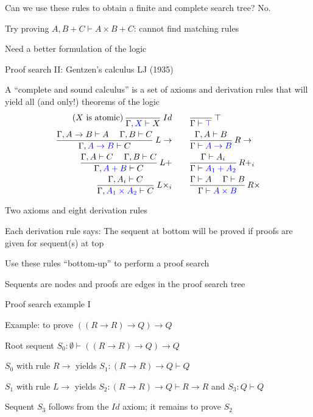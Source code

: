 \medskip{}
Can we use these rules to obtain a finite and complete search tree?
No.

Try proving $A,B+C\vdash A\times B+C$: cannot find matching rules

Need a better formulation of the logic

Proof search II: Gentzen's calculus LJ (1935)

A ``complete and sound calculus'' is a set of axioms and derivation
rules that will yield all (and only!) theorems of the logic
\begin{align*}
\text{(}X\text{ is atomic)\,}\frac{}{\Gamma,{\color{blue}X}\vdash X}\:Id & \qquad\frac{}{\Gamma\vdash{\color{blue}\top}}\,\top\\
\frac{\Gamma,A\rightarrow B\vdash A\quad\;\Gamma,B\vdash C}{\Gamma,{\color{blue}A\rightarrow B}\vdash C}\:L\rightarrow & \qquad\frac{\Gamma,A\vdash B}{\Gamma\vdash{\color{blue}A\rightarrow B}}\,R\rightarrow\\
\frac{\Gamma,A\vdash C\quad\;\Gamma,B\vdash C}{\Gamma,{\color{blue}A+B}\vdash C}\:L+ & \qquad\frac{\Gamma\vdash A_{i}}{\Gamma\vdash{\color{blue}A_{1}+A_{2}}}\,R+_{i}\\
\frac{\Gamma,A_{i}\vdash C}{\Gamma,{\color{blue}A_{1}\times A_{2}}\vdash C}\:L\times_{i} & \qquad\frac{\Gamma\vdash A\quad\;\Gamma\vdash B}{\Gamma\vdash{\color{blue}A\times B}}\,R\times
\end{align*}

Two axioms and eight derivation rules

Each derivation rule says: The sequent at bottom will be proved if
proofs are given for sequent(s) at top

Use these rules ``bottom-up'' to perform a proof search

Sequents are nodes and proofs are edges in the proof search tree

Proof search example I

Example: to prove $\left(\left(R\rightarrow R\right)\rightarrow Q\right)\rightarrow Q$

Root sequent $S_{0}:\emptyset\vdash\left(\left(R\rightarrow R\right)\rightarrow Q\right)\rightarrow Q$

$S_{0}$ with rule $R\rightarrow$ yields $S_{1}:\left(R\rightarrow R\right)\rightarrow Q\vdash Q$

$S_{1}$ with rule $L\rightarrow$ yields $S_{2}:\left(R\rightarrow R\right)\rightarrow Q\vdash R\rightarrow R$
and $S_{3}:Q\vdash Q$

Sequent $S_{3}$ follows from the $Id$ axiom; it remains to prove
$S_{2}$

